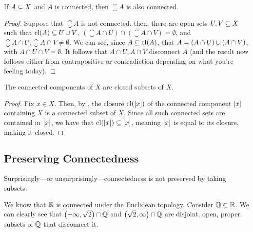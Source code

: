\begin{boxlemma}\label{Ch1:Lemma:closure_connected_connected}
    If $A \subseteq X$ and $A$ is connected, then $\closure{A}$ is also connected.
\end{boxlemma}
\begin{proof} %
    Suppose that $\closure{A}$ is not connected. then, there are open sets $U, V \subseteq X$ such that $\operatorname{cl}\!\left( A \right) \subseteq U \cup V$, $(\closure{A} \cap U)\cap (\closure{A}\cap V) = \emptyset$, and $\closure{A} \cap U, \closure{A} \cap V \neq \emptyset$.  We can see, since $A \subseteq \operatorname{cl}\!\left( A \right)$, that $A = \left( A \cap U \right) \cup \left( A \cap V \right)$, with $A \cap U \cap V = \emptyset$. It follows that $A\cap U, A\cap V$ disconnect $A$ (and the result now follows either from contrapositive or contradiction depending on what you're feeling today). %
\end{proof}

\begin{boxcorollary}
    The connected components of $X$ are closed subsets of $X$.
\end{boxcorollary}
\begin{proof}
    Fix $x \in X$. Then, by , the closure $\operatorname{cl}\!\left( \left[ x \right] \right)$ of the connected component $\left[ x \right]$ containing $X$ is a connected subset of $X$. Since all such connected sets are contained in $\left[ x \right]$, we have that $\operatorname{cl}\!\left( \left[ x \right] \right) \subseteq \left[ x \right]$, meaning $\left[ x \right]$ is equal to its closure, making it closed.
\end{proof}

\subsection{Preserving Connectedness}

Surprisingly---or unsurprisingly---connectedness is not preserved by taking subsets.

\begin{boxcexample}
    We know that $\mathbb{R}$ is connected under the Euclidean topology. Consider $\mathbb{Q} \subset \mathbb{R}$. We can clearly see that $\left( -\infty, \sqrt{2} \right) \cap \mathbb{Q}$ and $\left( \sqrt{2}, \infty \right) \cap \mathbb{Q}$ are disjoint, open, proper subsets of $\mathbb{Q}$ that disconnect it.
\end{boxcexample}

